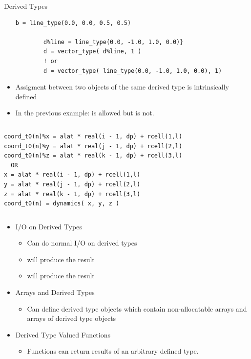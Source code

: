 \documentclass[10pt,t]{beamer}
\begin{document}
\begin{frame}{Derived Types}
\begin{itemize}
\begin{lstlisting}[language={[90]Fortran},basicstyle=\fontsize{5}{6}\selectfont\ttfamily]
        b = line_type(0.0, 0.0, 0.5, 0.5)

        d%line = line_type(0.0, -1.0, 1.0, 0.0)} 
        d = vector_type( d%line, 1 ) 
        ! or
        d = vector_type( line_type(0.0, -1.0, 1.0, 0.0), 1)
      \end{lstlisting}
      \framebreak
    \item Assigment between two objects of the same derived type is intrinsically defined
    \item[] In the previous  example:  is allowed but  is not.
  \end{itemize}
  \begin{columns}
    \begin{eblock}{}
      \begin{lstlisting}[language={[90]Fortran},basicstyle=\fontsize{5}{6}\selectfont\ttfamily]
coord_t0(n)%x = alat * real(i - 1, dp) + rcell(1,l)
coord_t0(n)%y = alat * real(j - 1, dp) + rcell(2,l)
coord_t0(n)%z = alat * real(k - 1, dp) + rcell(3,l)
  OR
x = alat * real(i - 1, dp) + rcell(1,l)
y = alat * real(j - 1, dp) + rcell(2,l)
z = alat * real(k - 1, dp) + rcell(3,l)
coord_t0(n) = dynamics( x, y, z )
      \end{lstlisting}
    \end{eblock}
  \end{columns}
  \begin{itemize}
    \item I/O on Derived Types
    \begin{itemize}
      \item Can do normal I/O on derived types
      \item[]  will produce the result 
      \item[]  will produce the result 
    \end{itemize}
    \item Arrays and Derived Types
    \begin{itemize}
      \item Can define derived type objects which contain non-allocatable arrays and arrays of derived type objects
    \end{itemize}
    \item Derived Type Valued Functions
    \begin{itemize}
      \item Functions can return results of an arbitrary defined type.
    \end{itemize}


\end{itemize}
\end{frame}
\end{document}
